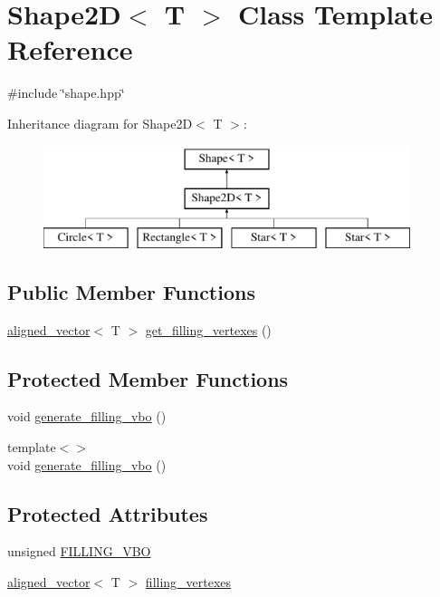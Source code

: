 \hypertarget{classShape2D}{}\section{Shape2D$<$ T $>$ Class Template Reference}
\label{classShape2D}


{\ttfamily \#include \char`\"{}shape.\+hpp\char`\"{}}

Inheritance diagram for Shape2D$<$ T $>$\+:\begin{figure}[H]
\begin{center}
\leavevmode
\includegraphics[height=3.000000cm]{classShape2D}
\end{center}
\end{figure}
\subsection*{Public Member Functions}
\begin{DoxyCompactItemize}
\item 
\mbox{\hyperlink{type__definitions_8hpp_accb98a876f193a416d9c8a02fe22d526}{aligned\+\_\+vector}}$<$ T $>$ \mbox{\hyperlink{classShape2D_af67c7aed6e58b5aa0e3518a3ad1de75b}{get\+\_\+filling\+\_\+vertexes}} ()
\end{DoxyCompactItemize}
\subsection*{Protected Member Functions}
\begin{DoxyCompactItemize}
\item 
void \mbox{\hyperlink{classShape2D_a210e702aa5918b88f25fb6b63a911fc8}{generate\+\_\+filling\+\_\+vbo}} ()
\item 
{\footnotesize template$<$$>$ }\\void \mbox{\hyperlink{classShape2D_a328d401b8f1962078e904d4b1003d7a5}{generate\+\_\+filling\+\_\+vbo}} ()
\end{DoxyCompactItemize}
\subsection*{Protected Attributes}
\begin{DoxyCompactItemize}
\item 
unsigned \mbox{\hyperlink{classShape2D_a220cf4cf96da8bd43627ffffd00a0718}{F\+I\+L\+L\+I\+N\+G\+\_\+\+V\+BO}}
\item 
\mbox{\hyperlink{type__definitions_8hpp_accb98a876f193a416d9c8a02fe22d526}{aligned\+\_\+vector}}$<$ T $>$ \mbox{\hyperlink{classShape2D_ae3e216c9d8422b47f46bff9259bd17be}{filling\+\_\+vertexes}}
\end{DoxyCompactItemize}


